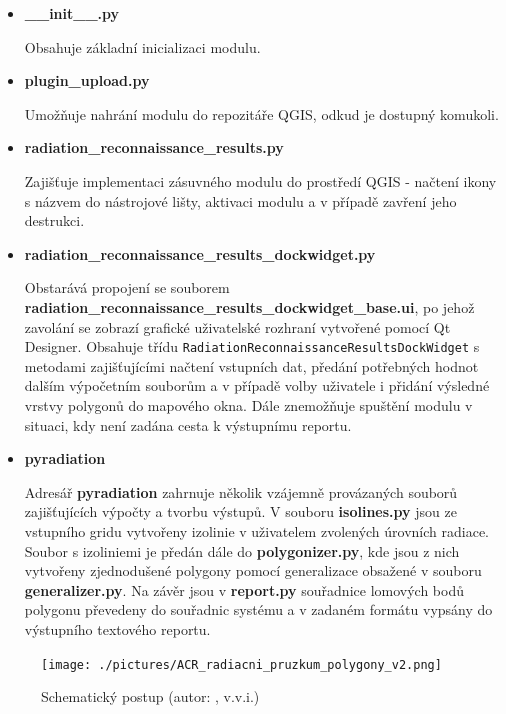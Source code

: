 \begin{itemize}
	\item \textbf{\_\_init\_\_.py} 
	
	Obsahuje základní inicializaci modulu.
		
	\item \textbf{plugin\_upload.py} 

	Umožňuje nahrání modulu do repozitáře QGIS, odkud je dostupný komukoli. 

	\item \textbf{radiation\_reconnaissance\_results.py} 
	
	Zajišťuje implementaci zásuvného modulu do prostředí QGIS - načtení ikony s názvem do nástrojové lišty, aktivaci modulu a v případě zavření jeho destrukci.

	\item \textbf{radiation\_reconnaissance\_results\_dockwidget.py}
	
	Obstarává propojení se souborem \textbf{radiation\_reconnaissance\_results\_dockwidget\_base.ui}, po jehož zavolání se zobrazí grafické uživatelské rozhraní vytvořené pomocí Qt Designer. Obsahuje třídu \texttt{RadiationReconnaissanceResultsDockWidget} s metodami zajišťujícími načtení vstupních dat, předání potřebných hodnot dalším výpočetním souborům a v případě volby uživatele i přidání výsledné vrstvy polygonů do mapového okna. Dále znemožňuje spuštění modulu v situaci, kdy není zadána cesta k výstupnímu reportu.

	\item \textbf{pyradiation}
		
		Adresář \textbf{pyradiation} zahrnuje několik vzájemně provázaných souborů zajišťujících výpočty a tvorbu výstupů. V souboru \textbf{isolines.py} jsou ze vstupního gridu vytvořeny izolinie v uživatelem zvolených úrovních radiace. Soubor s izoliniemi je předán dále do \textbf{polygonizer.py}, kde jsou z nich vytvořeny zjednodušené polygony pomocí generalizace obsažené v souboru \textbf{generalizer.py}. Na závěr jsou v \textbf{report.py} souřadnice lomových bodů polygonu převedeny do souřadnic systému  a v zadaném formátu vypsány do výstupního textového reportu.
	
\end{itemize}

\begin{figure}[H]
    \centering
      \texttt{[image: ./pictures/ACR\_radiacni\_pruzkum\_polygony\_v2.png]}
      \caption[Schematický postup]{Schematický postup (autor: , v.v.i.)}
      \label{fig:schema}
\end{figure}

